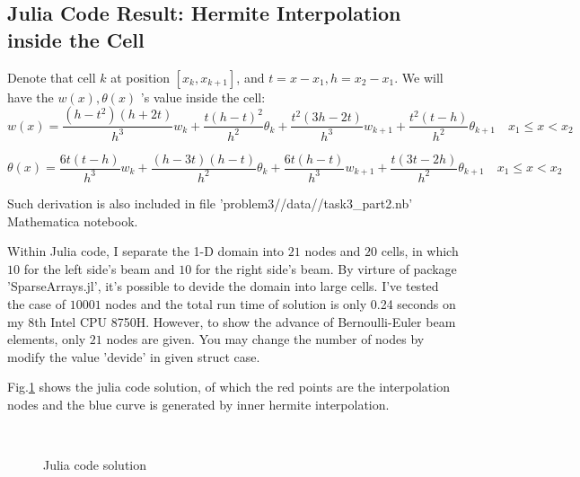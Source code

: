 \subsection{Julia Code Result: Hermite Interpolation inside the Cell}

Denote that cell $k$ at position $[x_k,x_{k+1}]$, and $t = x-x_1, h=x_2-x_1$. 
We will have the $w(x),\theta(x)$ 's value inside the cell:
\begin{equation}
    w(x)=
    \frac{(h-t^2)(h+2t)}{h^3}w_{k}+
    \frac{t(h-t)^2}{h^2}\theta_{k}+
    \frac{t^2(3h-2t)}{h^3}w_{k+1}+
    \frac{t^2(t-h)}{h^2}\theta_{k+1}\quad
    x_1\leq x < x_2
\end{equation}

\begin{equation}
    \theta(x)=
    \frac{6t(t-h)}{h^3}w_{k}+
    \frac{(h-3t)(h-t)}{h^2}\theta_{k}+
    \frac{6t(h-t)}{h^3}w_{k+1}+
    \frac{t(3t-2h)}{h^2}\theta_{k+1}\quad
    x_1\leq x < x_2
\end{equation}

Such derivation is also included in file 'problem3//data//task3\_part2.nb' Mathematica notebook.

Within Julia code, I separate the 1-D domain into $21$ nodes and $20$ cells, 
in which $10$ for the left side's beam and $10$ for the right side's beam. 
By virture of package 'SparseArrays.jl', it's possible to devide the domain into large cells. 
I've tested the case of $10001$ nodes and the total run time of solution is only 0.24 seconds on my 8th Intel CPU 8750H. 
However, to show the advance of Bernoulli-Euler beam elements, only $21$ nodes are given. 
You may change the number of nodes by modify the value 'devide' in given struct case.

Fig.\ref{Julia code solution} shows the julia code solution, of which 
the red points are the interpolation nodes and the blue curve is generated by inner hermite interpolation.

\begin{figure}[H]
    \centering
    \\
    \caption{Julia code solution}
    \label{Julia code solution}
\end{figure}

